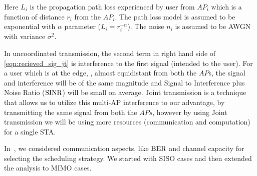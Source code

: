 Here $L_i$ is the propagation path loss experienced by user from $AP_i$ which is a function of distance $r_i$ from the $AP_i$. The path loss model is assumed to be exponential with $\alpha$ parameter ($L_i=r_i^{-\alpha}$). The noise $n_i$ is assumed to be AWGN with variance $\sigma^2$.

In uncoordinated transmission, the second term in right hand side of \eqref{eqn:recieved_sig_jt} is interference to the first signal (intended to the user).  For a user which is at the edge, \ie, almost equidistant from both the $AP$s, the signal and interference will be of the same magnitude and Signal to Interference plus Noise Ratio ($\text{SINR}$) will be small on average. Joint transmission is a technique that allows us to utilize this multi-AP interference to our advantage, by transmitting the same signal from both the $APs$, however by using Joint transmission we will be using more resources (communication and computation) for a single STA. 

In~\cite{JT_decision}, we considered communication aspects, like $\text{BER}$ and channel capacity for selecting the scheduling strategy. We started with SISO cases and then extended the analysis to MIMO cases.





